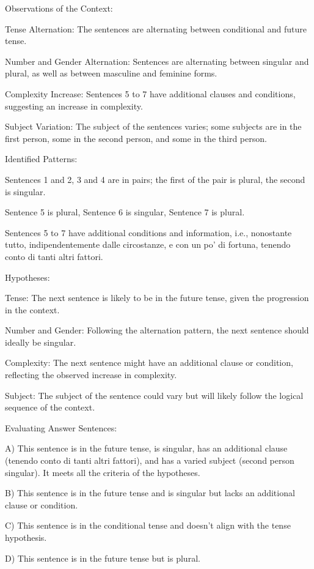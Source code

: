 Observations of the Context:

Tense Alternation: The sentences are alternating between conditional and future tense.

Number and Gender Alternation: Sentences are alternating between singular and plural, as well as between masculine and feminine forms.

Complexity Increase: Sentences 5 to 7 have additional clauses and conditions, suggesting an increase in complexity.

Subject Variation: The subject of the sentences varies; some subjects are in the first person, some in the second person, and some in the third person.

Identified Patterns:

Sentences 1 and 2, 3 and 4 are in pairs; the first of the pair is plural, the second is singular.

Sentence 5 is plural, Sentence 6 is singular, Sentence 7 is plural.

Sentences 5 to 7 have additional conditions and information, i.e., nonostante tutto, indipendentemente dalle circostanze, e con un po' di fortuna, tenendo conto di tanti altri fattori.

Hypotheses:

Tense: The next sentence is likely to be in the future tense, given the progression in the context.

Number and Gender: Following the alternation pattern, the next sentence should ideally be singular.

Complexity: The next sentence might have an additional clause or condition, reflecting the observed increase in complexity.

Subject: The subject of the sentence could vary but will likely follow the logical sequence of the context.

Evaluating Answer Sentences:

A) This sentence is in the future tense, is singular, has an additional clause (tenendo conto di tanti altri fattori), and has a varied subject (second person singular). It meets all the criteria of the hypotheses.

B) This sentence is in the future tense and is singular but lacks an additional clause or condition.

C) This sentence is in the conditional tense and doesn’t align with the tense hypothesis.

D) This sentence is in the future tense but is plural.

